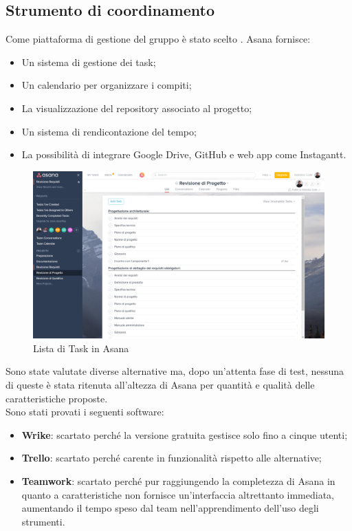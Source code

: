 \documentclass[../NormeDiProgetto.tex]{subfiles}
\begin{document}
			\subsection{Strumento di coordinamento}
				Come piattaforma di gestione del gruppo è stato scelto . Asana fornisce:
				\begin{itemize}
					\item Un sistema di gestione dei task;
					\item Un calendario per organizzare i compiti;
					\item La visualizzazione del repository associato al progetto;
					\item Un sistema di rendicontazione del tempo;
					\item La possibilità di integrare Google Drive, GitHub e web app come Instagantt.
				\end{itemize}
				\begin{figure} [h!]
					\centering
					\includegraphics[scale=0.2]{./Immagini/Asana.png}
					\caption{Lista di Task in Asana}\label{fig:TaskAsana}
				\end{figure}
				Sono state valutate diverse alternative ma, dopo un'attenta fase di test, nessuna di queste è
				stata ritenuta all'altezza di Asana per quantità e qualità delle caratteristiche proposte.\\
				Sono stati provati i seguenti software:
				\begin{itemize}
					\item \textbf{Wrike}: scartato perché la versione gratuita gestisce solo fino a cinque utenti;
					\item \textbf{Trello}: scartato perché carente in funzionalità rispetto alle alternative;  
					\item \textbf{Teamwork}: scartato perché pur raggiungendo la completezza di Asana in quanto
					a caratteristiche non fornisce un'interfaccia altrettanto immediata, aumentando il tempo
					speso dal team nell'apprendimento dell'uso degli strumenti.
				\end{itemize}
\end{document}
